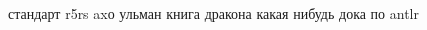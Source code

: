 \documentclass[12pt,a4paper,oneside]{extarticle}
\begin{document}
\begin{thebibliography}{00}
     стандарт r5rs
     axо ульман книга дракона
     какая нибудь дока по antlr
\end{thebibliography}





        
\end{document}
